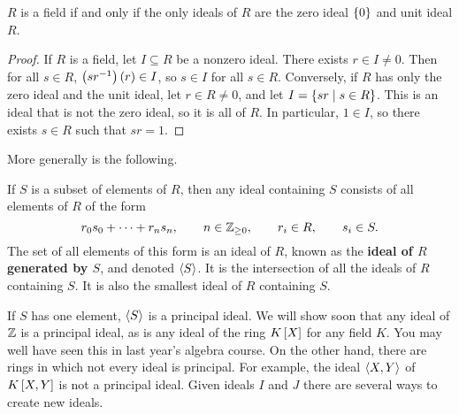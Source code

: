 \begin{proposition}
$ R $ is a field if and only if the only ideals of $ R $ are the zero ideal $ \cb{0} $ and unit ideal $ R $.
\end{proposition}

\begin{proof}
If $ R $ is a field, let $ I \subseteq R $ be a nonzero ideal. There exists $ r \in I \ne 0 $. Then for all $ s \in R $, $ \rb{sr^{-1}}\rb{r} \in I $, so $ s \in I $ for all $ s \in R $. Conversely, if $ R $ has only the zero ideal and the unit ideal, let $ r \in R \ne 0 $, and let $ I = \cb{sr \mid s \in R} $. This is an ideal that is not the zero ideal, so it is all of $ R $. In particular, $ 1 \in I $, so there exists $ s \in R $ such that $ sr = 1 $.
\end{proof}

More generally is the following.

\begin{definition}
If $ S $ is a subset of elements of $ R $, then any ideal containing $ S $ consists of all elements of $ R $ of the form
$$ r_0s_0 + \dots + r_ns_n , \qquad n \in \Z_{\ge 0}, \qquad r_i \in R, \qquad s_i \in S. $$
The set of all elements of this form is an ideal of $ R $, known as the \textbf{ideal of $ R $ generated by $ S $}, and denoted $ \ab{S} $. It is the intersection of all the ideals of $ R $ containing $ S $. It is also the smallest ideal of $ R $ containing $ S $.
\end{definition}

If $ S $ has one element, $ \ab{S} $ is a principal ideal. We will show soon that any ideal of $ \Z $ is a principal ideal, as is any ideal of the ring $ K\sb{X} $ for any field $ K $. You may well have seen this in last year's
algebra course. On the other hand, there are rings in which not every ideal is principal. For example, the ideal $ \ab{X, Y} $ of $ K\sb{X, Y} $ is not a principal ideal. Given ideals $ I $ and $ J $ there are several ways to create new ideals.

